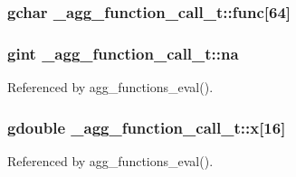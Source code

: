 \subsubsection[{func}]{\setlength{\rightskip}{0pt plus 5cm}gchar \+\_\+agg\+\_\+function\+\_\+call\+\_\+t\+::func[64]}\label{struct__agg__function__call__t_a967a8c4eabd2595bd362585559abfade}
\subsubsection[{na}]{\setlength{\rightskip}{0pt plus 5cm}gint \+\_\+agg\+\_\+function\+\_\+call\+\_\+t\+::na}\label{struct__agg__function__call__t_a6ec7c698033caba84a74a49482b58fe3}


Referenced by agg\+\_\+functions\+\_\+eval().

\subsubsection[{x}]{\setlength{\rightskip}{0pt plus 5cm}gdouble \+\_\+agg\+\_\+function\+\_\+call\+\_\+t\+::x[16]}\label{struct__agg__function__call__t_ae550f5dfe4c245d0a3382bd5396beb85}


Referenced by agg\+\_\+functions\+\_\+eval().

